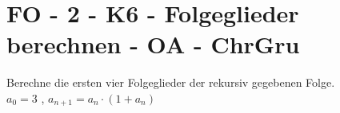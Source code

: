 \section{FO - 2 - K6 - Folgeglieder berechnen - OA - ChrGru}

\begin{beispiel}[FO]{1}
Berechne die ersten vier Folgeglieder der rekursiv gegebenen Folge. \\
$a_0=3$ , $a_{n+1}=a_n \cdot (1+a_n)$ \\
\end{beispiel}